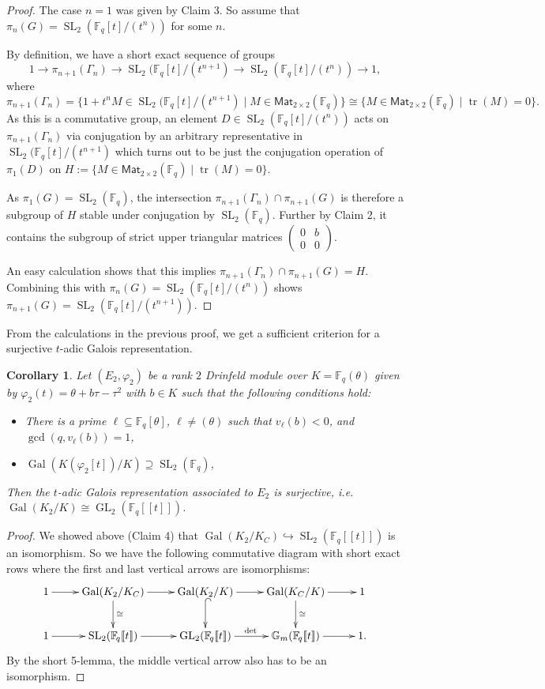 \documentclass[10pt,a4paper]{amsart}
\theoremstyle{plain} %
\newtheorem{Corollary}[Theorem]{Corollary}
\theoremstyle{definition}
\theoremstyle{remark}
\newcommand{\FF}{\mathbb{F}}
\newcommand{\GG}{\mathbb{G}}
\newcommand{\tr}{\operatorname{tr}}
\newcommand{\Fq}{\FF_{\!q}}  %
\newcommand{\Gal}{\operatorname{Gal}}
\newcommand{\Mat}{\mathsf{Mat}}
\newcommand{\GL}{\operatorname{GL}}
\newcommand{\SL}{\operatorname{SL}}
\newcommand{\ps}[1]{[\![#1]\!]}  %
\numberwithin{equation}{subsection}
\begin{document}
\begin{proof}
The case $n=1$ was given by Claim 3. So assume that $\pi_n(G)=\SL_2(\Fq[t]/(t^n))$ for some $n$.

By definition, we have a short exact sequence of groups
\[ 1 \to \pi_{n+1}(\Gamma_n) \to \SL_2(\Fq[t]/(t^{n+1}) \to \SL_2(\Fq[t]/(t^n)) \to 1, \]
where
\[ \pi_{n+1}(\Gamma_n)=\{ 1+t^nM\in \SL_2(\Fq[t]/(t^{n+1}) \mid M\in \Mat_{2\times 2}(\Fq) \} \cong \{ M\in \Mat_{2\times 2}(\Fq) \mid \tr(M)=0\}.\]
As this is a commutative group, an element $D\in \SL_2(\Fq[t]/(t^n))$ acts on $\pi_{n+1}(\Gamma_n)$ via conjugation by an arbitrary representative in $\SL_2(\Fq[t]/(t^{n+1})$ which turns out to be just the conjugation operation of $\pi_1(D)$ on $H:=\{ M\in \Mat_{2\times 2}(\Fq) \mid \tr(M)=0\}$.

As $\pi_1(G)=\SL_2(\Fq)$, the intersection $\pi_{n+1}(\Gamma_n)\cap \pi_{n+1}(G)$ is therefore a subgroup of $H$ stable under conjugation by $\SL_2(\Fq)$.
Further by Claim 2, it contains the subgroup of strict upper triangular matrices $\begin{pmatrix}
0 & b \\ 0 & 0
\end{pmatrix}$.

An easy calculation shows that this implies $\pi_{n+1}(\Gamma_n)\cap \pi_{n+1}(G)=H$. Combining this with $\pi_n(G)=\SL_2(\Fq[t]/(t^n))$ shows 
$\pi_{n+1}(G)=\SL_2(\Fq[t]/(t^{n+1}))$.
\end{proof}


From the calculations in the previous proof, we get a sufficient criterion for a surjective $t$-adic Galois representation.

\begin{Corollary}\label{cor:surjective-Galois-representation}
Let $(E_2, \varphi_2)$ be a rank $2$ Drinfeld module over  $K=\Fq(\theta)$ given by $\varphi_2(t)=\theta+b\tau-\tau^2$ with $b\in K$ such that the following conditions hold:
\begin{itemize}
\item There is a prime $\ell\subseteq \Fq[\theta]$, $\ell\neq (\theta)$ such that $v_\ell(b)<0$, and $\operatorname{gcd}(q, v_\ell(b))=1$,
\item $\Gal(K(\varphi_2[t])/K)\supseteq \SL_2(\Fq)$,
\end{itemize}
Then the $t$-adic Galois representation associated to $E_2$ is surjective, i.e.~$\Gal(K_2/K)\cong \GL_2(\Fq\ps{t})$.
\end{Corollary}

\begin{proof}
    We showed above (Claim 4) that $\Gal(K_2/K_C)\hookrightarrow \SL_2(\Fq\ps{t})$ is an isomorphism. So we have the following commutative diagram with short exact rows where the first and last vertical arrows are isomorphisms:
\[\xymatrix{
1\ar[r] & \Gal(K_2/K_C) \ar[r] \ar[d]^{\cong} & \Gal(K_2/K) \ar[r]\ar@{^{(}->}[d] & \Gal(K_C/K) \ar[r] \ar[d]^{\cong} & 1 \\
1\ar[r] &  \SL_2(\Fq\ps{t})\ar[r] & \GL_2(\Fq\ps{t}) \ar[r]^{\det} & \GG_m(\Fq\ps{t}) \ar[r] & 1. 
}\]
By the short 5-lemma, the middle vertical arrow also has to be an isomorphism.
\end{proof}
\end{document}
